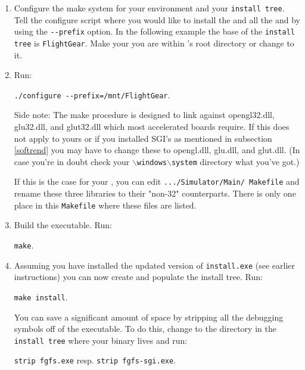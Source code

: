 \begin{enumerate}
\item Configure the make system for your environment and your
\texttt{install tree}. Tell the configure script where you would like to install the
 and all the  and  by using the
\texttt{-$\!$-prefix} option. In the following example the base of the \texttt{install
tree} is \texttt{FlightGear}. Make your you are within \FlightGear's root directory or
change to it.

\item Run:

        \texttt{./configure -$\!$-prefix=/mnt/FlightGear}.

 \noindent
Side note: The make procedure is designed to link against opengl32.dll, glu32.dll, and
glut32.dll which most accelerated boards require. If this does not apply to yours or if
you installed SGI's  as mentioned in subsection \ref{softrend}
you may have to change these to opengl.dll, glu.dll, and glut.dll. (In case you're in
doubt check your \texttt{$\backslash$windows$\backslash$system} directory what you've
got.)

 If this is the case for your , you can edit
 \texttt{.../Simulator/Main/ Makefile} and rename these three libraries to
    their "non-32" counterparts.  There is only one place in this
    \texttt{Makefile} where these files are listed.

\item Build the executable.  Run:

        \texttt{make}.

\item Assuming you have installed the updated version of
\texttt{install.exe} (see earlier instructions) you can now create
and populate the install tree.  Run:

        \texttt{make install}.

    You can save a significant amount of space by stripping all the
    debugging symbols off of the executable.  To do this, change to the
    directory in the \texttt{install tree} where your binary lives and run:

        \texttt{strip fgfs.exe} resp. \texttt{strip fgfs-sgi.exe}.

\end{enumerate}


